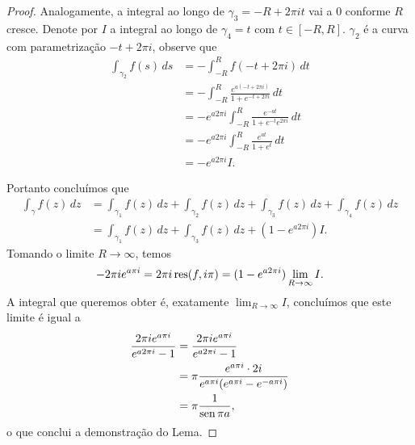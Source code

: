 \begin{proof}
        Analogamente, a integral ao longo de $\gamma_3 = -R + 2\pi i t$ vai a $0$ conforme $R$ cresce. Denote por $I$ a integral ao longo de $\gamma_4 = t$ com $t \in [-R,R]$. $\gamma_2$ é a curva com parametrização $-t + 2\pi i$, observe que
        \begin{align*}
            \int_{\gamma_2}f(s) \, ds &= -\int_{-R}^{R}f(-t + 2\pi i) \, dt \\
            &= -\int_{-R}^{R}\frac{e^{a(-t + 2 \pi i)}}{1 + e^{-t + 2\pi i}} \, dt \\
            &= -e^{a2\pi i}\int_{-R}^{R}\frac{e^{-at}}{1 + e^{-t}e^{2\pi i}} \, dt \\
            &= -e^{a2\pi i}\int_{-R}^{R}\frac{e^{at}}{1 + e^{t}} \, dt \\
            &= -e^{a2\pi i}I.
        \end{align*}
        
        Portanto concluímos que 
        \begin{align*}
        \int_\gamma f(z) \, dz &= \int_{\gamma_1} f(z) \, dz + \int_{\gamma_2} f(z) \, dz + \int_{\gamma_3} f(z) \, dz + \int_{\gamma_4} f(z) \, dz \\
        &= \int_{\gamma_1} f(z) \, dz + \int_{\gamma_3} f(z) \, dz + (1 - e^{a 2\pi i}) I.
        \end{align*}
        Tomando o limite $R \to \infty$, temos
        $$-2\pi ie^{a\pi i} = 2\pi i \operatorname{res}(f,i\pi) = (1 - e^{a 2\pi i}) \lim_{R \to \infty}I.$$
        A integral que queremos obter é, exatamente $\lim_{R \to \infty}I$, concluímos que este limite é igual a
        \begin{align*}
            \frac{2\pi ie^{a\pi i}}{e^{a 2\pi i} - 1} &= \frac{2\pi ie^{a\pi i}}{e^{a 2\pi i} - 1} \\
            &= \pi \frac{ e^{a\pi i} \cdot 2i}{e^{a \pi i}(e^{a \pi i} - e^{-a \pi i})}\\
            &= \pi \frac{1}{\operatorname{sen} \pi a},
        \end{align*}
        o que conclui a demonstração do Lema.
    \end{proof}
    
    
    
    
    
    
    
    
    
    
